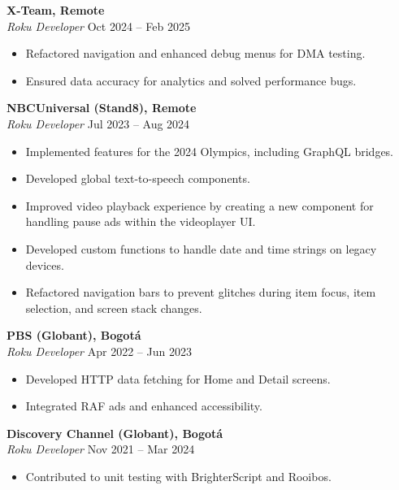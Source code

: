 \documentclass[11pt,a4paper]{article}
\begin{document}
\vspace{0.5em}

\textbf{X-Team, Remote} \\
\emph{Roku Developer} \hfill Oct 2024 -- Feb 2025 \\
\begin{itemize}[leftmargin=*]
    \item Refactored navigation and enhanced debug menus for DMA testing.
    \item Ensured data accuracy for analytics and solved performance bugs.
\end{itemize}

\textbf{NBCUniversal (Stand8), Remote} \\
\emph{Roku Developer} \hfill Jul 2023 -- Aug 2024 \\
\begin{itemize}[leftmargin=*]
    \item Implemented features for the 2024 Olympics, including GraphQL bridges.
    \item Developed global text-to-speech components.
    \item Improved video playback experience by creating a new component for handling pause ads within the videoplayer UI.
    \item Developed custom functions to handle date and time strings on legacy devices.
    \item Refactored navigation bars to prevent glitches during item focus, item selection,
and screen stack changes.
\end{itemize}

\textbf{PBS (Globant), Bogotá} \\
\emph{Roku Developer} \hfill Apr 2022 -- Jun 2023 \\
\begin{itemize}[leftmargin=*]
    \item Developed HTTP data fetching for Home and Detail screens.
    \item Integrated RAF ads and enhanced accessibility.
\end{itemize}

\textbf{Discovery Channel (Globant), Bogotá} \\
\emph{Roku Developer} \hfill Nov 2021 -- Mar 2024 \\
\begin{itemize}[leftmargin=*]
    \item Contributed to unit testing with BrighterScript and Rooibos.
\end{itemize}
\end{document}
